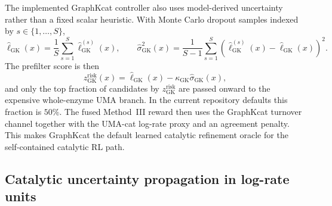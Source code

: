 \documentclass[11pt]{article}
\begin{document}
	The implemented GraphKcat controller also uses model-derived uncertainty rather than a fixed scalar heuristic. With Monte Carlo dropout samples indexed by $s\in\{1,\ldots,S\}$,
	\begin{equation}
		\widehat \ell_{\mathrm{GK}}(x)
		=
		\frac{1}{S}\sum_{s=1}^{S}\widehat \ell_{\mathrm{GK}}^{(s)}(x),
		\qquad
		\widehat \sigma_{\mathrm{GK}}^2(x)
		=
		\frac{1}{S-1}\sum_{s=1}^{S}\left(\widehat \ell_{\mathrm{GK}}^{(s)}(x)-\widehat \ell_{\mathrm{GK}}(x)\right)^2.
	\end{equation}
	The prefilter score is then
	\begin{equation}
		z_{\mathrm{GK}}^{\mathrm{risk}}(x)
		=
		\widehat \ell_{\mathrm{GK}}(x)-\kappa_{\mathrm{GK}}\widehat \sigma_{\mathrm{GK}}(x),
	\end{equation}
	and only the top fraction of candidates by $z_{\mathrm{GK}}^{\mathrm{risk}}$ are passed onward to the expensive whole-enzyme UMA branch. In the current repository defaults this fraction is $50\%$. The fused Method~III reward then uses the GraphKcat turnover channel together with the UMA-cat log-rate proxy and an agreement penalty. This makes GraphKcat the default learned catalytic refinement oracle for the self-contained catalytic RL path.
	
	\subsection{Catalytic uncertainty propagation in log-rate units}
	
\end{document}
